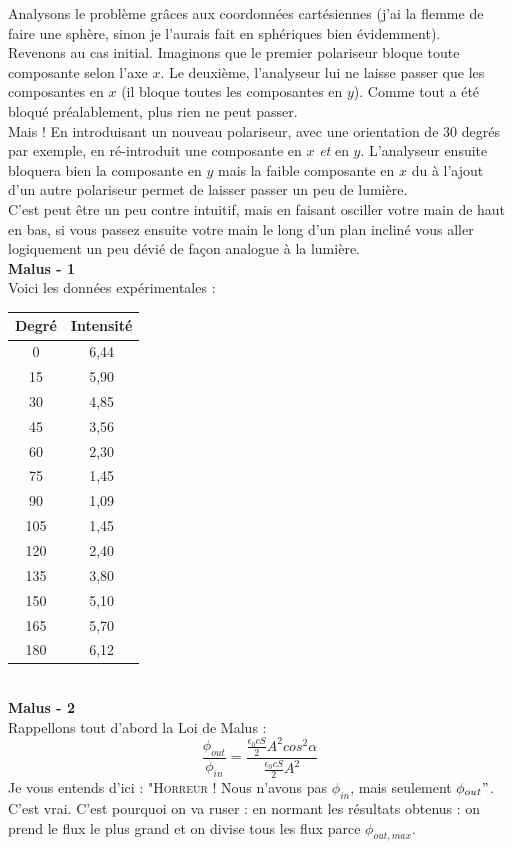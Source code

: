 \documentclass	[11pt, a4paper, openany]{book}
\begin{document}
Analysons le problème grâces aux coordonnées cartésiennes (j'ai la flemme de faire une sphère, sinon je l'aurais fait en sphériques bien évidemment).\\
Revenons au cas initial.  Imaginons que le premier polariseur bloque toute composante selon l'axe $x$. Le deuxième, l'analyseur lui ne laisse passer que les composantes en $x$ (il bloque toutes les composantes en $y$). Comme tout a été bloqué préalablement, plus rien ne peut passer.\\
Mais ! En introduisant un nouveau polariseur, avec une orientation de $30$ degrés par exemple, en ré-introduit une composante en $x$ \textit{et} en $y$. L'analyseur ensuite bloquera bien la composante en $y$ mais la faible composante en $x$ du à l'ajout d'un autre polariseur permet de laisser passer un peu de lumière.\\

C'est peut être un peu contre intuitif, mais en faisant osciller votre main de haut en bas, si vous passez ensuite votre main le long d'un plan incliné vous aller logiquement un peu dévié de façon analogue à la lumière.\\

\textbf{Malus - 1}\\
Voici les données expérimentales : 
\begin{center}
\begin{tabular}{|c|c|}
\hline 
Degré & Intensité \\ 
\hline 
0 & 6,44 \\ 
\hline 
15 & 5,90 \\ 
\hline 
30 & 4,85 \\ 
\hline 
45 & 3,56 \\ 
\hline 
60 & 2,30 \\ 
\hline 
75 & 1,45 \\ 
\hline 
90 & 1,09 \\ 
\hline 
105 & 1,45 \\ 
\hline 
120 & 2,40 \\ 
\hline 
135 & 3,80 \\ 
\hline 
150 & 5,10 \\ 
\hline 
165 & 5,70 \\ 
\hline 
180 & 6,12 \\ 
\hline 
\end{tabular} 
\end{center}
\ \\
\textbf{Malus - 2}\\
Rappellons tout d'abord la Loi de Malus :
\begin{equation}
\frac{\phi_{out}}{\phi_{in}} = \frac{\frac{\epsilon_0 cS}{2}A^2cos^2\alpha}{\frac{\epsilon_0 c S}{2}A^2}
\end{equation}
Je vous entends d'ici : "\textsc{Horreur !} Nous n'avons pas $\phi_{in}$, mais seulement $\phi_{out}"$. C'est vrai. C'est pourquoi on va ruser : en normant les résultats obtenus : on prend le flux le plus grand et on divise tous les flux parce $\phi_{out, max}$.\\
\end{document}
